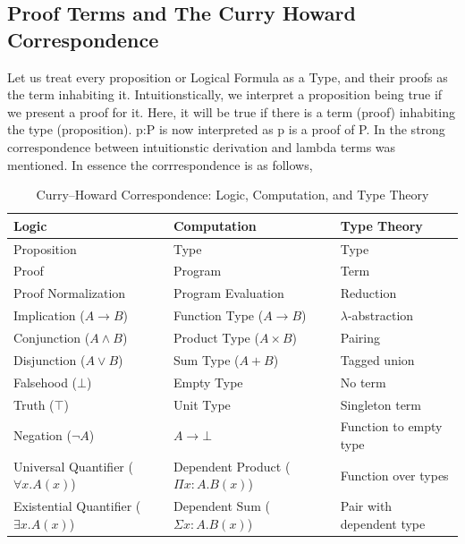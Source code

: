 \documentclass[12pt]{article}
\begin{document}
\subsection{Proof Terms and The Curry Howard Correspondence}
    Let us treat every proposition or Logical Formula as a Type, and their proofs as the term inhabiting it. Intuitionstically, we interpret a proposition being true if we present a proof for it. Here, it will be true if there is a term (proof) inhabiting the type (proposition).
    p:P is now interpreted as p is a proof of P. In \cite{How} the strong correspondence between intuitionstic derivation and lambda terms was mentioned. In essence the corrrespondence is as follows,
    \begin{table}[h]
\centering
\begin{tabular}{|l|l|l|}
\hline
\textbf{Logic}                & \textbf{Computation}         & \textbf{Type Theory}             \\ \hline
Proposition                  & Type                         & Type                             \\ \hline
Proof                        & Program                      & Term                             \\ \hline
Proof Normalization          & Program Evaluation           & Reduction                        \\ \hline
Implication ($A \rightarrow B$) & Function Type ($A \to B$)    & $\lambda$-abstraction            \\ \hline
Conjunction ($A \land B$)    & Product Type ($A \times B$)  & Pairing                          \\ \hline
Disjunction ($A \lor B$)     & Sum Type ($A + B$)           & Tagged union                     \\ \hline
Falsehood ($\bot$)           & Empty Type                   & No term                          \\ \hline
Truth ($\top$)               & Unit Type                    & Singleton term                   \\ \hline
Negation ($\neg A$)          & $A \to \bot$                 & Function to empty type           \\ \hline
Universal Quantifier ($\forall x. A(x)$) & Dependent Product ($\Pi x : A. B(x)$) & Function over types \\ \hline
Existential Quantifier ($\exists x. A(x)$) & Dependent Sum ($\Sigma x : A. B(x)$) & Pair with dependent type \\ \hline


\end{tabular}
\caption{Curry–Howard Correspondence: Logic, Computation, and Type Theory}
\end{table}\\
\end{document}
